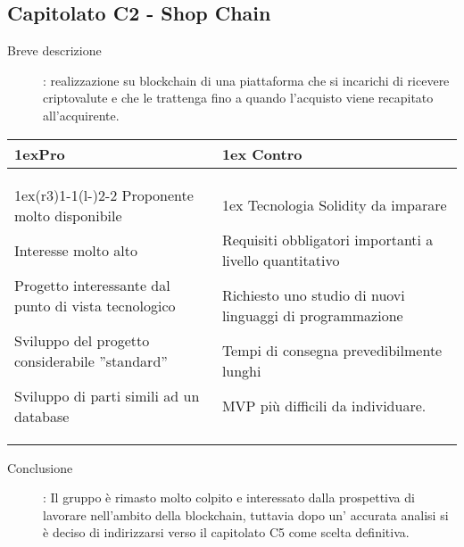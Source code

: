 \subsection*{Capitolato C2 - Shop Chain}
\begin{description}
\item [Breve descrizione]: realizzazione su blockchain di una piattaforma che si incarichi di ricevere criptovalute e che le trattenga fino a quando l'acquisto viene recapitato all’acquirente.
\end{description}
\begin{table}[h]
\begin{tabularx}{\linewidth}{>{\parskip1ex}X@{\kern4\tabcolsep}>{\parskip1ex}X}
\hfil\bfseries Pro
&
\hfil\bfseries Contro
\\\cmidrule(r{3\tabcolsep}){1-1}\cmidrule(l{-\tabcolsep}){2-2}
Proponente molto disponibile \par
Interesse molto alto \par
Progetto interessante dal punto di vista tecnologico \par
Sviluppo del progetto considerabile ”standard” \par
Sviluppo di parti simili ad un database
&
Tecnologia Solidity da imparare \par 
Requisiti obbligatori importanti a livello quantitativo \par
Richiesto uno studio di nuovi linguaggi di programmazione \par
Tempi di consegna prevedibilmente lunghi \par
MVP più difficili da individuare. \\
\end{tabularx}
\end{table}
\begin{description}
	\item [Conclusione]: Il gruppo è rimasto molto colpito e interessato dalla prospettiva di lavorare nell'ambito della blockchain, tuttavia dopo un' accurata analisi si è deciso di indirizzarsi verso il capitolato C5 come scelta definitiva.
\end{description}

